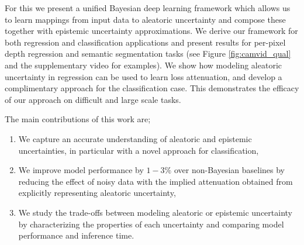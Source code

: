 \documentclass{article}
\begin{document}
For this we present a unified Bayesian deep learning framework which allows us to learn mappings from input data to aleatoric uncertainty and compose these together with epistemic uncertainty approximations. We derive our framework for both regression and classification applications and present results for per-pixel depth regression and semantic segmentation tasks (see Figure \ref{fig:camvid_qual} and the supplementary video for examples). 
We show how modeling aleatoric uncertainty in regression can be used to learn loss attenuation, and develop a complimentary approach for the classification case. 
This demonstrates the efficacy of our approach on difficult and large scale tasks.

The main contributions of this work are; 
\begin{enumerate}[topsep=0pt,itemsep=1ex,partopsep=1ex,parsep=1ex]
\item We capture an accurate understanding of aleatoric and epistemic uncertainties, in particular with a novel approach for classification,
\item We improve model performance by $1-3\%$ over non-Bayesian baselines by reducing the effect of noisy data with the implied attenuation obtained from explicitly representing aleatoric uncertainty,
\item We study the trade-offs between modeling aleatoric or epistemic uncertainty by characterizing the properties of each uncertainty and comparing model performance and inference time.
\end{enumerate}
\end{document}
